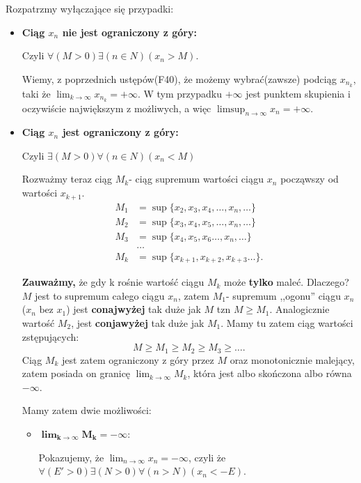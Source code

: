 	Rozpatrzmy wyłączające się przypadki:
	\begin{itemize}
	\item \textbf{Ciąg $x_{n}$ nie jest ograniczony z góry:}
	
	Czyli $\forall\left(M>0\right)\exists\left(n\in N\right)\left( x_{n} >M \right).$

	Wiemy, z poprzednich ustępów(F40), że możemy wybrać(zawsze) podciąg $x_{n_{k}}$, taki że $\lim\nolimits_{k \to \infty} x_{n_{k}} = +\infty$. W tym przypadku $+\infty$ jest punktem skupienia i oczywiście największym z możliwych, a więc $\limsup_{n \to \infty} x_{n} = +\infty$.
	\item \textbf{Ciąg $x_{n}$ jest ograniczony z góry:}
	
	Czyli $\exists\left(M>0\right)\forall\left(n\in N\right)\left( x_{n} < M \right) $

	Rozważmy teraz ciąg $M_{k}$- ciąg supremum wartości ciągu $x_{n}$ począwszy od wartości $x_{k+1}$.
	\begin{align*}
		M _{1} &= \sup\{x_2,x_3,x_4,\ldots, x_{n},\ldots\}\\
		M _{2} &= \sup\{x_3,x_4,x_5,\ldots, x_{n},\ldots\}\\
		M _{3} &= \sup\{x_4,x_5,x_6\ldots, x_{n},\ldots\}\\
		           & \ldots \\
		M _{k} &= \sup\{x_{k+1}, x_{k+2},x_{k+3}\ldots\}
	.\end{align*}

	\textbf{Zauważmy,} że gdy k rośnie wartość ciągu $M_{k}$ może \textbf{tylko} maleć. Dlaczego? $M$ jest to supremum całego ciągu $x_{n}$, zatem $M_1$- supremum ,,ogonu'' ciągu  $x_{n}$($x_{n} \text{ bez }x_1$) jest \textbf{conajwyżej} tak duże jak $M$ tzn $M\ge M_1$. Analogicznie wartość $M_2$, jest \textbf{conjawyżej} tak duże jak $M_1$. Mamy tu zatem ciąg wartości zstępujących: \[
	M \ge M_1 \ge M_2 \ge M_3 \ge \ldots
	.\]  
	Ciąg $M_{k}$ jest zatem ograniczony z góry przez $M$ oraz monotonicznie malejący, zatem posiada on granicę $\lim\nolimits_{k \to \infty} M_k$, która jest albo skończona albo równa $-\infty$.
	
	Mamy zatem dwie możliwości:
	\begin{itemize}[label=$\ast$]
		\item $\bm{ \lim\nolimits_{k \to \infty} M_{k} = -\infty } $: 

			Pokazujemy, że $\lim\nolimits_{n \to \infty} x_{n} = -\infty$, czyli że $\forall\left(E'>0\right)\exists\left(N>0\right)\forall\left(n>N\right)  \left(x_{n}<-E  \right).$
	

\end{itemize}
\end{itemize}
